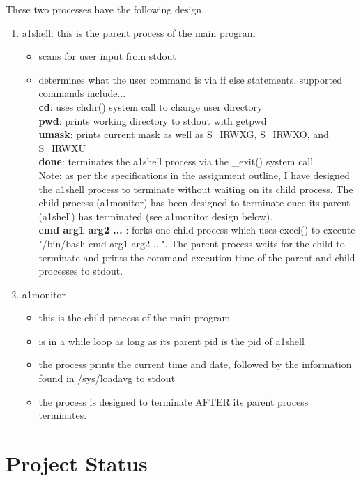 \documentclass{article}
\begin{document}
\noindent
These two processes have the following design.
\begin{enumerate}
   \item a1shell: this is the parent process of the main program
   \begin{itemize}
     \item scans for user input from stdout
     \item determines what the user command is via if else statements.
       supported commands include...\\

     \textbf{cd}: uses chdir() system call to change user directory \\
     \textbf{pwd}: prints working directory to stdout with getpwd\\
     \textbf{umask}: prints current mask as well as S\_IRWXG, S\_IRWXO, and S\_IRWXU\\
     \textbf{done}: terminates the a1shell process via the \_exit() system call \\
     Note: as per the specifications in the assignment outline, I have designed the a1shell
     process to terminate without waiting on its child process. The child process (a1monitor) has
     been designed to terminate once its parent (a1shell) has terminated (see a1monitor design
     below). \\
     \textbf{cmd arg1 arg2 ...} : forks one child process which uses execl() to execute
     "/bin/bash cmd arg1 arg2 ...". The parent process waits for the child to terminate and
     prints the command execution time of the parent and child processes to stdout.
   \end{itemize}
   \item a1monitor
   \begin{itemize}
     \item this is the child process of the main program
     \item is in a while loop as long as its parent pid is the pid of a1shell
     \item the process prints the current time and date, followed by the information found
     in /sys/loadavg to stdout
     \item the process is designed to terminate AFTER its parent process terminates.
   \end{itemize}
\end{enumerate}

\section{Project Status}
\end{document}

